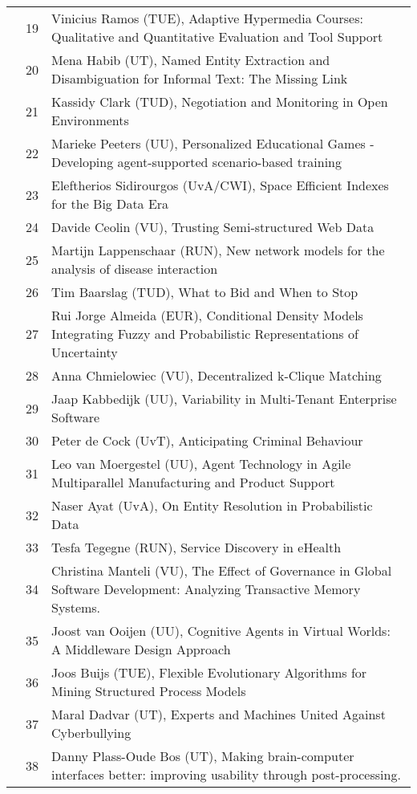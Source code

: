 \begin{longtabu}{@{}l@{ }l@{\hspace{1em}}X}
	&	 19	&	 Vinicius Ramos (TUE), 	Adaptive Hypermedia Courses: Qualitative and Quantitative Evaluation and Tool Support\\
	&	 20	&	 Mena Habib (UT), Named Entity Extraction and Disambiguation for Informal Text: The Missing Link\\
	&	 21	&	 Kassidy Clark (TUD), 	Negotiation and Monitoring in Open Environments\\
	&	 22	&	 Marieke Peeters (UU), Personalized Educational Games - Developing agent-supported scenario-based training\\
	&	 23	&	 Eleftherios Sidirourgos (UvA/CWI), 	Space Efficient Indexes for the Big Data Era\\
	&	 24	&	 Davide Ceolin (VU), Trusting Semi-structured Web Data\\
	&	 25	&	 Martijn Lappenschaar (RUN), 	New network models for the analysis of disease interaction\\
	&	 26	&	 Tim Baarslag (TUD), What to Bid and When to Stop\\
	&	 27	&	 Rui Jorge Almeida (EUR), 	Conditional Density Models Integrating Fuzzy and Probabilistic Representations of Uncertainty\\
	&	 28	&	 Anna Chmielowiec (VU), 	Decentralized k-Clique Matching\\
	&	 29	&	 Jaap Kabbedijk (UU), 	Variability in Multi-Tenant Enterprise Software\\
	&	 30	&	 Peter de Cock (UvT), 	Anticipating Criminal Behaviour\\
	&	 31	&	 Leo van Moergestel (UU), 	Agent Technology in Agile Multiparallel Manufacturing and Product Support\\
	&	 32	&	 Naser Ayat (UvA), 	On Entity Resolution in Probabilistic Data\\
	&	 33	&	 Tesfa Tegegne (RUN), Service Discovery in eHealth\\
	&	 34	&	 Christina Manteli (VU), 	The Effect of Governance in Global Software Development: Analyzing Transactive Memory Systems.\\
	&	 35	&	 Joost van Ooijen (UU), 	Cognitive Agents in Virtual Worlds: A Middleware Design Approach\\
	&	 36	&	 Joos Buijs (TUE), 	Flexible Evolutionary Algorithms for Mining Structured Process Models\\
	&	 37	&	 Maral Dadvar (UT), 	Experts and Machines United Against Cyberbullying\\
	&	 38	&	 Danny Plass-Oude Bos (UT), 	Making brain-computer interfaces better: improving usability through post-processing.\\

\end{longtabu}
